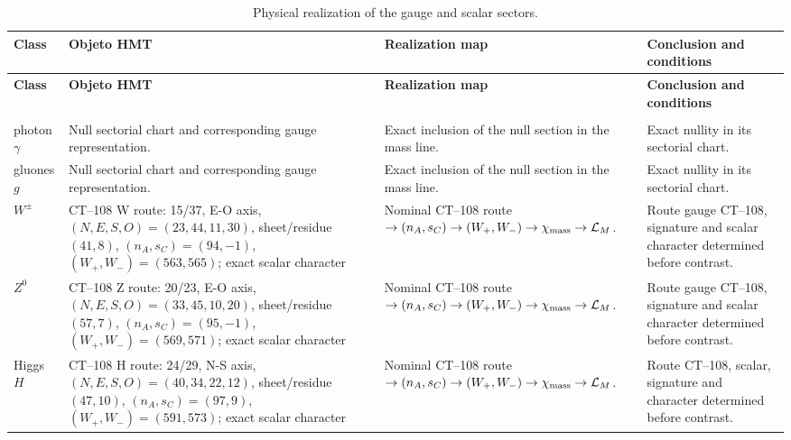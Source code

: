 \begingroup
\setlength{\tabcolsep}{4.5pt}
\renewcommand{\arraystretch}{1.28}
\begin{longtable}{@{}>{\raggedright\arraybackslash}p{}>{\raggedright\arraybackslash}p{}>{\raggedright\arraybackslash}p{}>{\raggedright\arraybackslash}p{}@{}}
\caption{Physical realization of the gauge and scalar sectors.}\label{tab:masas-realizacion-gauge-escalar}\\
\toprule
\textbf{Class} & \textbf{Objeto HMT} & \textbf{Realization map} & \textbf{Conclusion and conditions} \\
\midrule
\endfirsthead
\toprule
\textbf{Class} & \textbf{Objeto HMT} & \textbf{Realization map} & \textbf{Conclusion and conditions} \\
\midrule
\endhead
\midrule
\multicolumn{4}{r}{\footnotesize Continues on the following page.}\\
\endfoot
\bottomrule
\endlastfoot
photon$\gamma$ & Null sectorial chart and corresponding gauge representation. & Exact inclusion of the null section in the mass line. & Exact nullity in its sectorial chart. \\
gluones $g$ & Null sectorial chart and corresponding gauge representation. & Exact inclusion of the null section in the mass line. & Exact nullity in its sectorial chart. \\
$W^\pm$ & CT--108 W route: 15/37, E-O axis, $(N,E,S,O)=(23,44,11,30)$, sheet/residue $(41,8)$, $(n_A,s_C)=(94,-1)$, $(W_+,W_-)=(563,565)$; exact scalar character & Nominal CT--108 route $\to(n_A,s_C)\to(W_+,W_-)\to\chi_{\rm mass}\to\mathcal L_M$. & Route gauge CT--108, signature and scalar character determined before contrast. \\
$Z^0$ & CT--108 Z route: 20/23, E-O axis, $(N,E,S,O)=(33,45,10,20)$, sheet/residue $(57,7)$, $(n_A,s_C)=(95,-1)$, $(W_+,W_-)=(569,571)$; exact scalar character & Nominal CT--108 route $\to(n_A,s_C)\to(W_+,W_-)\to\chi_{\rm mass}\to\mathcal L_M$. & Route gauge CT--108, signature and scalar character determined before contrast. \\
Higgs $H$ & CT--108 H route: 24/29, N-S axis, $(N,E,S,O)=(40,34,22,12)$, sheet/residue $(47,10)$, $(n_A,s_C)=(97,9)$, $(W_+,W_-)=(591,573)$; exact scalar character & Nominal CT--108 route $\to(n_A,s_C)\to(W_+,W_-)\to\chi_{\rm mass}\to\mathcal L_M$. & Route CT--108, scalar, signature and character determined before contrast. \\
\end{longtable}
\endgroup

